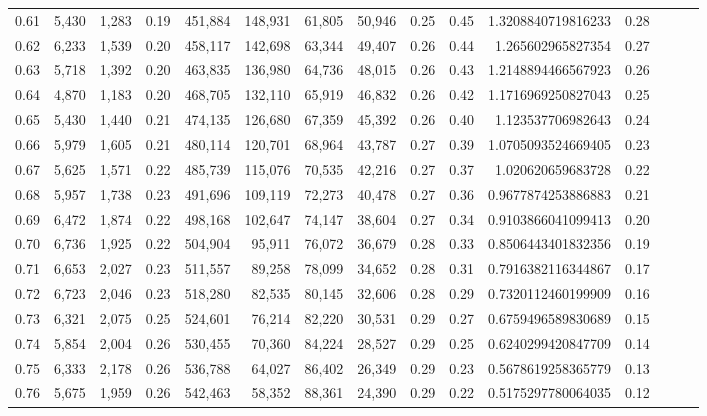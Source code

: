 \begin{tabular}{rrrrrrrrrrrrrrr}
0.61 &   5,430 &  1,283 &  0.19 &  451,884 &  148,931 &   61,805 &   50,946 &  0.25 &  0.45 &   1.3208840719816233 &      0.28 \\
0.62 &   6,233 &  1,539 &  0.20 &  458,117 &  142,698 &   63,344 &   49,407 &  0.26 &  0.44 &    1.265602965827354 &      0.27 \\
0.63 &   5,718 &  1,392 &  0.20 &  463,835 &  136,980 &   64,736 &   48,015 &  0.26 &  0.43 &   1.2148894466567923 &      0.26 \\
0.64 &   4,870 &  1,183 &  0.20 &  468,705 &  132,110 &   65,919 &   46,832 &  0.26 &  0.42 &   1.1716969250827043 &      0.25 \\
0.65 &   5,430 &  1,440 &  0.21 &  474,135 &  126,680 &   67,359 &   45,392 &  0.26 &  0.40 &    1.123537706982643 &      0.24 \\
0.66 &   5,979 &  1,605 &  0.21 &  480,114 &  120,701 &   68,964 &   43,787 &  0.27 &  0.39 &   1.0705093524669405 &      0.23 \\
0.67 &   5,625 &  1,571 &  0.22 &  485,739 &  115,076 &   70,535 &   42,216 &  0.27 &  0.37 &    1.020620659683728 &      0.22 \\
0.68 &   5,957 &  1,738 &  0.23 &  491,696 &  109,119 &   72,273 &   40,478 &  0.27 &  0.36 &   0.9677874253886883 &      0.21 \\
0.69 &   6,472 &  1,874 &  0.22 &  498,168 &  102,647 &   74,147 &   38,604 &  0.27 &  0.34 &   0.9103866041099413 &      0.20 \\
0.70 &   6,736 &  1,925 &  0.22 &  504,904 &   95,911 &   76,072 &   36,679 &  0.28 &  0.33 &   0.8506443401832356 &      0.19 \\
0.71 &   6,653 &  2,027 &  0.23 &  511,557 &   89,258 &   78,099 &   34,652 &  0.28 &  0.31 &   0.7916382116344867 &      0.17 \\
0.72 &   6,723 &  2,046 &  0.23 &  518,280 &   82,535 &   80,145 &   32,606 &  0.28 &  0.29 &   0.7320112460199909 &      0.16 \\
0.73 &   6,321 &  2,075 &  0.25 &  524,601 &   76,214 &   82,220 &   30,531 &  0.29 &  0.27 &   0.6759496589830689 &      0.15 \\
0.74 &   5,854 &  2,004 &  0.26 &  530,455 &   70,360 &   84,224 &   28,527 &  0.29 &  0.25 &   0.6240299420847709 &      0.14 \\
0.75 &   6,333 &  2,178 &  0.26 &  536,788 &   64,027 &   86,402 &   26,349 &  0.29 &  0.23 &   0.5678619258365779 &      0.13 \\
0.76 &   5,675 &  1,959 &  0.26 &  542,463 &   58,352 &   88,361 &   24,390 &  0.29 &  0.22 &   0.5175297780064035 &      0.12 \\

\end{tabular}
